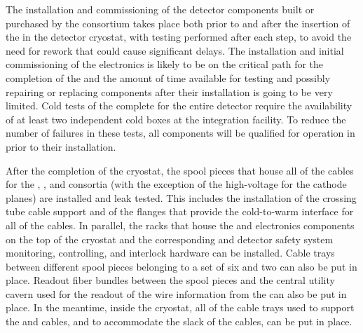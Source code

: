 The installation and commissioning of the detector components built or
purchased by the  consortium takes place both prior to
and after the insertion of the  in the
detector cryostat, with testing performed after each step, to avoid the
need for rework that could cause significant delays. The installation and
initial commissioning of the  electronics is likely to be on the critical
path for the completion of the  and the amount of
time available for testing and possibly repairing or replacing components
after their installation is going to be very limited. Cold tests of the complete
 for the entire detector require the
availability of at least two independent cold boxes at the integration facility.
To reduce the number of failures in these tests, all  components will
be qualified for operation in \lar prior to their installation.

After the completion of the cryostat, the spool pieces that house all of
the cables for the , , and  consortia (with the exception of the
high-voltage \fdth for the cathode planes) are installed and leak tested.
This includes the installation of the crossing tube cable support and of
the flanges that provide the cold-to-warm interface for all of the cables.
In parallel, the racks that house the  and  electronics components on
the top of the cryostat and the corresponding  and detector safety
system monitoring, controlling, and interlock hardware can be installed.
Cable trays between different spool pieces belonging to a set of six 
and two  can also be put in place. Readout fiber bundles between the
spool pieces and the central utility cavern used for the readout of the wire
information from the  can also be put in place. In the meantime, inside
the cryostat, all of the cable trays used to support the  and  cables, and
to accommodate the slack of the cables, can be put in place.

